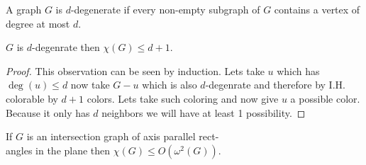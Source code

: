 \begin{defn}
	A graph $G$ is $d$-degenerate if every non-empty subgraph of $G$ contains a vertex of degree at most $d$.
\end{defn}

\begin{observ}
	$G$ is $d$-degenrate then $\chi(G) \leq d+1$.
\end{observ}

\begin{proof}
	This observation can be seen by induction. Lets take $u$ which has $\deg(u) \leq d$ now take $G - u$ which is also $d$-degenrate and therefore by I.H. colorable by $d+1$ colors. Lets take such coloring and now give $u$ a possible color. Because it only has $d$ neighbors we will have at least 1 possibility.
\end{proof}

\begin{thm}
	If $G$ is an intersection graph of axis parallel rect-\\angles in the plane then $\chi(G) \leq O(\omega^2 (G))$.
\end{thm}

